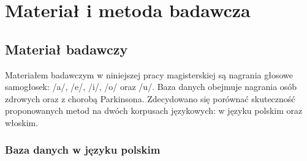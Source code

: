 \chapter{Materiał i metoda badawcza}

%


\section{Materiał badawczy}
\label{sec:material-badawczy}

Materiałem badawczym w niniejszej pracy magisterskiej są nagrania głosowe samogłosek: /a/, /e/, /i/, /o/ oraz /u/.
Baza danych obejmuje nagrania osób zdrowych oraz z chorobą Parkinsona.
Zdecydowano się porównać skuteczność proponowanych metod na dwóch korpusach językowych: w języku polskim oraz włoskim.

\subsection{Baza danych w języku polskim}
\label{subsec:polska-baza}

